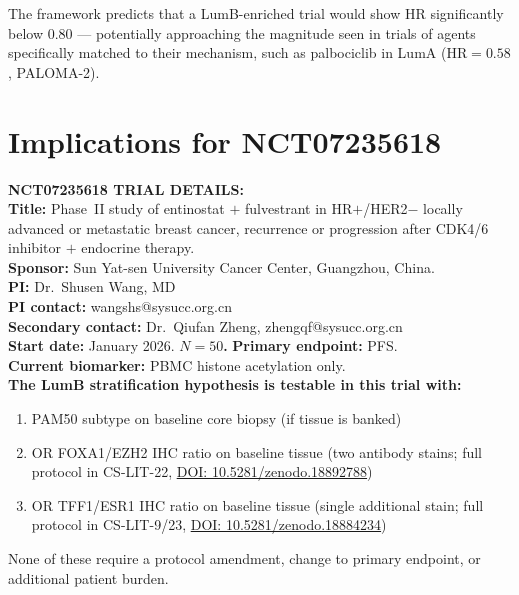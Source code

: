 \documentclass[12pt, a4paper]{article}
\begin{document}
The framework predicts that a LumB-enriched trial
would show HR significantly below $0.80$ ---
potentially approaching the magnitude seen in trials
of agents specifically matched to their mechanism,
such as palbociclib in LumA (HR$=0.58$, PALOMA-2).

\section{Implications for NCT07235618}

\begin{center}
\colorbox{actionbox}{
\begin{minipage}{0.88\textwidth}
\vspace{0.5em}
\textbf{NCT07235618 TRIAL DETAILS:}\\[0.4em]
\textbf{Title:} Phase~II study of entinostat
$+$ fulvestrant in HR$+$/HER2$-$ locally advanced
or metastatic breast cancer, recurrence or
progression after CDK4/6 inhibitor $+$ endocrine
therapy.\\[0.3em]
\textbf{Sponsor:} Sun Yat-sen University Cancer
Center, Guangzhou, China.\\[0.3em]
\textbf{PI:} Dr.\ Shusen Wang, MD\\[0.3em]
\textbf{PI contact:} wangshs@sysucc.org.cn\\[0.3em]
\textbf{Secondary contact:} Dr.\ Qiufan Zheng,
zhengqf@sysucc.org.cn\\[0.3em]
\textbf{Start date:} January 2026.
\textbf{$N=50$.}
\textbf{Primary endpoint:} PFS.\\[0.3em]
\textbf{Current biomarker:} PBMC histone
acetylation only.\\[0.4em]
\textbf{The LumB stratification hypothesis is
testable in this trial with:}
\begin{enumerate}[noitemsep]
    \item PAM50 subtype on baseline core biopsy
    (if tissue is banked)
    \item OR FOXA1/EZH2 IHC ratio on baseline
    tissue (two antibody stains; full protocol
    in CS-LIT-22,
    \href{https://doi.org/10.5281/zenodo.18892788}
    {DOI: 10.5281/zenodo.18892788})
    \item OR TFF1/ESR1 IHC ratio on baseline tissue
    (single additional stain; full protocol in
    CS-LIT-9/23,
    \href{https://doi.org/10.5281/zenodo.18884234}
    {DOI: 10.5281/zenodo.18884234})
\end{enumerate}
None of these require a protocol amendment,
change to primary endpoint, or additional
patient burden.
\vspace{0.5em}
\end{minipage}}
\end{center}
\end{document}
